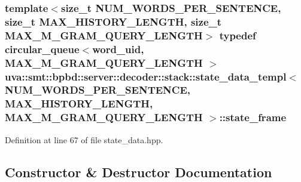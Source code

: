 \subsubsection[{state\+\_\+frame}]{\setlength{\rightskip}{0pt plus 5cm}template$<$size\+\_\+t N\+U\+M\+\_\+\+W\+O\+R\+D\+S\+\_\+\+P\+E\+R\+\_\+\+S\+E\+N\+T\+E\+N\+C\+E, size\+\_\+t M\+A\+X\+\_\+\+H\+I\+S\+T\+O\+R\+Y\+\_\+\+L\+E\+N\+G\+T\+H, size\+\_\+t M\+A\+X\+\_\+\+M\+\_\+\+G\+R\+A\+M\+\_\+\+Q\+U\+E\+R\+Y\+\_\+\+L\+E\+N\+G\+T\+H$>$ typedef {\bf circular\+\_\+queue}$<${\bf word\+\_\+uid}, M\+A\+X\+\_\+\+M\+\_\+\+G\+R\+A\+M\+\_\+\+Q\+U\+E\+R\+Y\+\_\+\+L\+E\+N\+G\+T\+H $>$ {\bf uva\+::smt\+::bpbd\+::server\+::decoder\+::stack\+::state\+\_\+data\+\_\+templ}$<$ N\+U\+M\+\_\+\+W\+O\+R\+D\+S\+\_\+\+P\+E\+R\+\_\+\+S\+E\+N\+T\+E\+N\+C\+E, M\+A\+X\+\_\+\+H\+I\+S\+T\+O\+R\+Y\+\_\+\+L\+E\+N\+G\+T\+H, M\+A\+X\+\_\+\+M\+\_\+\+G\+R\+A\+M\+\_\+\+Q\+U\+E\+R\+Y\+\_\+\+L\+E\+N\+G\+T\+H $>$\+::{\bf state\+\_\+frame}}\label{structuva_1_1smt_1_1bpbd_1_1server_1_1decoder_1_1stack_1_1state__data__templ_a2c9ed737e7c43cdf19eda95e25db2a0d}


Definition at line 67 of file state\+\_\+data.\+hpp.



\subsection{Constructor \& Destructor Documentation}
\hypertarget{structuva_1_1smt_1_1bpbd_1_1server_1_1decoder_1_1stack_1_1state__data__templ_ab1d11ad1ba4c89051ad0606b12130647}{}
